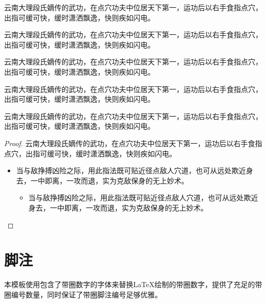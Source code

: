 \documentclass[print, doctor, vlined]{DissertUESTC}
\begin{document}
	\begin{proposition}[具体名称]
		云南大理段氏嫡传的武功，在点穴功夫中位居天下第一，运功后以右手食指点穴，出指可缓可快，缓时潇洒飘逸，快则疾如闪电。
	\end{proposition}
	
	\begin{corollary}[具体名称]
		云南大理段氏嫡传的武功，在点穴功夫中位居天下第一，运功后以右手食指点穴，出指可缓可快，缓时潇洒飘逸，快则疾如闪电。
	\end{corollary}
	
	\begin{lemma}[具体名称]
		云南大理段氏嫡传的武功，在点穴功夫中位居天下第一，运功后以右手食指点穴，出指可缓可快，缓时潇洒飘逸，快则疾如闪电。
	\end{lemma}

	\begin{example}[具体名称]
		云南大理段氏嫡传的武功，在点穴功夫中位居天下第一，运功后以右手食指点穴，出指可缓可快，缓时潇洒飘逸，快则疾如闪电。
	\end{example}

	\begin{assumption}[具体名称]
		云南大理段氏嫡传的武功，在点穴功夫中位居天下第一，运功后以右手食指点穴，出指可缓可快，缓时潇洒飘逸，快则疾如闪电。
	\end{assumption}
	
	\begin{proof}
		云南大理段氏嫡传的武功，在点穴功夫中位居天下第一，运功后以右手食指点穴，出指可缓可快，缓时潇洒飘逸，快则疾如闪电。
		\begin{itemize}
			\item 当与敌挣搏凶险之际，用此指法既可贴近径点敌人穴道，也可从远处欺近身去，一中即离，一攻而退，实为克敌保身的无上妙术。
			\begin{itemize}
				\item 当与敌挣搏凶险之际，用此指法既可贴近径点敌人穴道，也可从远处欺近身去，一中即离，一攻而退，实为克敌保身的无上妙术。
			\end{itemize}
		\end{itemize}
	\end{proof}
	
	\newpage

	\section{脚注}
	
	本模板使用包含了带圈数字的字体来替换LaTeX绘制的带圈数字，提供了充足的带圈编号数量，同时保证了带圈脚注编号足够优雅。
	
\end{document}

